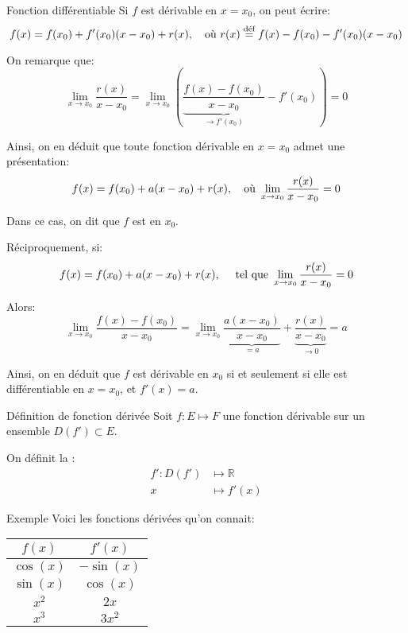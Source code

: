 \documentclass[a4paper]{article}
\begin{document}
\begin{parag}{Fonction différentiable}
    Si $f$ est dérivable en $x = x_0$, on peut écrire:
    \[f\left(x\right) = f\left(x_0\right) + f'\left(x_0\right)\left(x - x_0\right) + r\left(x\right), \mathspace \text{où } r\left(x\right) \over{=}{déf} f\left(x\right) - f\left(x_0\right) - f'\left(x_0\right)\left(x - x_0\right)\]

    On remarque que:
    \[\lim_{x \to x_0} \frac{r\left(x\right)}{x - x_0} = \lim_{x \to x_0}  \left(\underbrace{\frac{f\left(x\right) - f\left(x_0\right)}{x - x_0}}_{\to f'\left(x_0\right)} - f'\left(x_0\right)\right) = 0\]

    Ainsi, on en déduit que toute fonction dérivable en $x = x_0$ admet une présentation:
    \[f\left(x\right) = f\left(x_0\right) + a\left(x - x_0\right) + r\left(x\right), \mathspace \text{où } \lim_{x \to x_0} \frac{r\left(x\right)}{x - x_0} = 0\]

    Dans ce cas, on dit que $f$ est  en $x_0$.

    Réciproquement, si:
    \[f\left(x\right) = f\left(x_0\right) + a\left(x - x_0\right) + r\left(x\right), \mathspace \telque \lim_{x \to x_0} \frac{r\left(x\right)}{x - x_0} = 0\]

    Alors:
    \[\lim_{x \to x_0} \frac{f\left(x\right) - f\left(x_0\right)}{x - x_0} = \lim_{x \to x_0} \underbrace{\frac{a\left(x - x_0\right)}{x - x_0}}_{= a} + \underbrace{\frac{r\left(x\right)}{x - x_0}}_{\to 0} = a\]

    Ainsi, on en déduit que $f$ est dérivable en $x_0$ si et seulement si elle est différentiable en $x = x_0$, et $f'\left(x\right) = a$.
\end{parag}

\begin{parag}{Définition de fonction dérivée}
    Soit $f : E \mapsto F$ une fonction dérivable sur un ensemble $D\left(f'\right) \subset E$.

    On définit la :
    \[\begin{split}
        f': D\left(f'\right) &\longmapsto \mathbb{R} \\
        x &\longmapsto f'\left(x\right)
    \end{split}\]
\end{parag}

\begin{parag}{Exemple}
    Voici les fonctions dérivées qu'on connait:
    \begin{center}
    \begin{tabular}{c|c}
        $f\left(x\right)$ & $f'\left(x\right)$ \\
        \hline
        $\cos\left(x\right)$ & $-\sin\left(x\right)$ \\
        $\sin\left(x\right)$ & $\cos\left(x\right)$  \\
        $x^2$ & $2x$ \\
        $x^3$ & $3x^2$
    \end{tabular}
    \end{center}
\end{parag}
\end{document}
